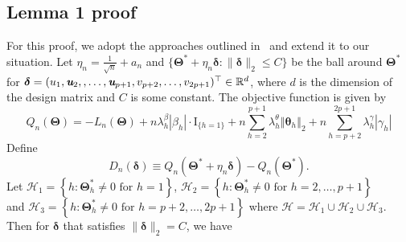 \documentclass[12pt,letter]{article}\usepackage[]{graphicx}\usepackage[]{color}
\newcommand{\bTheta}{\boldsymbol{\Theta}}
\newcommand{\btheta}{\boldsymbol{\theta}}
\newcommand{\bThetastar}{\boldsymbol{\Theta}^{*}}
\newcommand{\bdelta}{\boldsymbol{\delta}}
\begin{document}
\subsection{Lemma 1 proof}
For this proof, we adopt the approaches outlined in~\citep{fan2001variable,choi2010variable,nardi2008asymptotic,wang2007regression} and extend it to our situation. Let $\eta_{n}=\frac{1}{\sqrt{n}}+a_{n}$ and $\{\bTheta^{*}+\eta_{n}\boldsymbol{\delta}:\|\boldsymbol{\delta}\|_2\leq C\}$
be the ball around $\bTheta^{*}$ for $\boldsymbol{\delta}=(u_{1}, \textit{\textbf{u}}_2, ,\ldots, \textit{\textbf{u}}_{p+1},v_{p+2},\ldots,v_{2p+1})^{\top} \in \mathbb{R}^d$, where $d$ is the dimension of the design matrix and $C$ is some constant. The objective function is given by
\begin{equation*}
Q_n(\bTheta)
=-L_n(\bTheta)+n\lambda_{h}^{\beta}\left|\beta_{h}\right| \cdot \textrm{I}_{\lbrace h=1 \rbrace} + n\sum_{h=2}^{p+1}      \lambda_{h}^{\theta}\left\Vert \btheta_{h}\right\Vert _{2}  +n\sum_{h=p+2}^{2p+1}\lambda_{h}^{\gamma}\left|\gamma_{h}\right|
\end{equation*}
Define 
\[ D_{n}(\boldsymbol{\delta})\equiv Q_{n}(\bThetastar+\eta_{n}\bdelta)-Q_{n}(\bThetastar).\] Let $\mathcal{H}_1=\left\lbrace h : \bThetastar_h \neq 0 \textrm{ for }h=1 \right\rbrace$, $\mathcal{H}_2=\left\lbrace h : \bThetastar_h \neq 0 \textrm{ for }h=2, \ldots, p+1 \right\rbrace$ \\and $\mathcal{H}_3=\left\lbrace h : \bThetastar_h \neq 0 \textrm{ for }h=p+2, \ldots, 2p+1 \right\rbrace$ where $\mathcal{H} = \mathcal{H}_1 \cup \mathcal{H}_2 \cup \mathcal{H}_3$. Then for $\bdelta$ that satisfies $\|\bdelta\|_2=C$, we have
\end{document}
